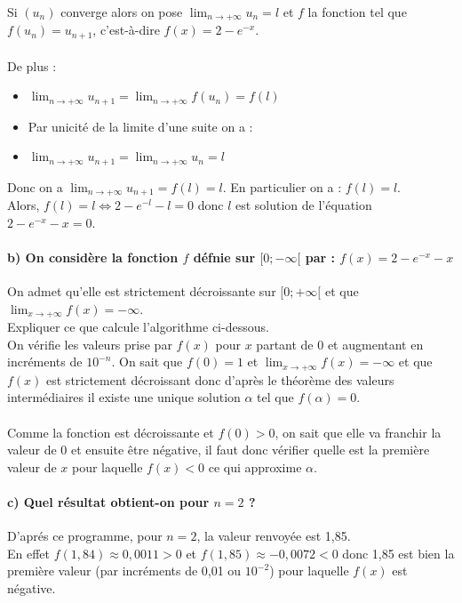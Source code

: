 \documentclass[a4paper, 12pt]{article}
\begin{document}
Si $(u_n)$ converge alors on pose $\displaystyle \lim_{n \to +\infty}u_n=l$ et $f$ la fonction tel que $f(u_n) = u_{n+1}$, c'est-à-dire $f(x) = 2 - e^{-x}$.
\\ \\
De plus :
\begin{itemize} 
    \item[\textbullet] $\displaystyle \lim_{n \to +\infty} u_{n+1} = \displaystyle \lim_{n \to +\infty} f(u_n) = f(l)$ \\[0.5mm]
    \item[] Par unicité de la limite d'une suite on a : \\[0.5mm]
    \item[\textbullet] $\displaystyle \lim_{n \to +\infty} u_{n+1} = \displaystyle \lim_{n \to +\infty} u_n = l$ \\[1mm]
\end{itemize}
Donc on a $\displaystyle \lim_{n \to +\infty} u_{n+1} = f(l) = l$. En particulier on a : $f(l) = l$.
\\
Alors, $f(l) = l \iff 2 - e^{-l} - l = 0$ donc $l$ est solution de l'équation $2 - e^{-x}-x=0$.

{}
\paragraph*{b) On considère la fonction $f$ défnie sur $[0;-\infty[$ par : $f(x)=2-e^{-x}-x$}

On admet qu'elle est strictement décroissante sur $[0;+\infty[$ et que $\displaystyle \lim_{x \to +\infty}f(x)=-\infty$.
\\
Expliquer ce que calcule l'algorithme ci-dessous.
\\[5mm]
On vérifie les valeurs prise par $f(x)$ pour $x$ partant de 0 et augmentant en incréments de $10^{-n}$. On sait que $f(0) = 1$ et $\displaystyle \lim_{x \to +\infty}f(x) = -\infty$ et que 
$f(x)$ est strictement décroissant donc d'après le théorème des valeurs intermédiaires il existe une unique solution $\alpha$ tel que $f(\alpha)=0$. 
\\ \\
Comme la fonction est décroissante et $f(0)>0$, on sait que elle va franchir la valeur de 0 et ensuite être négative, il faut donc vérifier quelle est la première valeur de $x$ 
pour laquelle $f(x)<0$ ce qui approxime $\alpha$.

{}
\paragraph*{c) Quel résultat obtient-on pour $n=2$ ?\\[5mm]}

D'aprés ce programme, pour $n=2$, la valeur renvoyée est 1,85. 
\\
En effet $f(1,84) \approx 0,0011 >0$ et $f(1,85) \approx -0,0072 < 0$ donc 1,85 est bien la première valeur (par incréments de 0,01 ou $10^{-2}$) pour laquelle $f(x)$ est négative.

\newpage
{}
\tableofcontents
\end{document}
